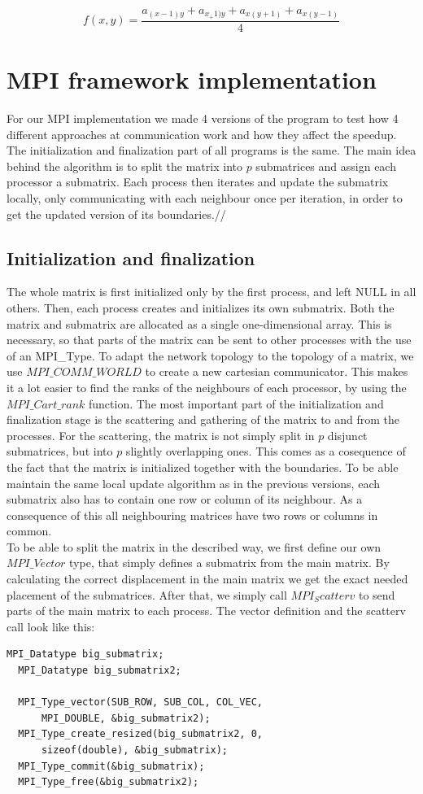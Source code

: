 \documentclass[11pt]{article}
\begin{document}
\[  f(x, y) = \frac{a_{(x-1)y} + a_{x_+1)y} + a_{x(y+1)} + a_{x(y-1)}}{4}  \]



\section{MPI framework implementation}

For our MPI implementation we made 4 versions of the program to test how 4 different approaches at communication work and how they affect the speedup.
The initialization and finalization part of all programs is the same. The main idea behind the algorithm is to split the matrix into $p$ submatrices and assign
each processor a submatrix. Each process then iterates and update the submatrix locally, only communicating with each neighbour once per iteration, in order to
get the updated version of its boundaries.//
\subsection{Initialization and finalization}
The whole matrix is first initialized only by the first process, and left NULL in all others.
Then, each process creates and initializes its own submatrix. Both the matrix and submatrix are allocated as a single one-dimensional array. This is necessary, so that 
parts of the matrix can be sent to other processes with the use of an MPI\_Type. To adapt the network topology to the topology of a matrix, we use $MPI\_COMM\_WORLD$ to
create a new cartesian communicator. This makes it a lot easier to find the ranks of the neighbours of each processor, by using the $MPI\_Cart\_rank$ function.
The most important part of the initialization and finalization stage is the scattering and gathering of the matrix to and from the processes. For the scattering, the
matrix is not simply split in $p$ disjunct submatrices, but into $p$ slightly overlapping ones. This comes as a cosequence of the fact that the matrix is initialized together
with the boundaries. To be able maintain the same local update algorithm as in the previous versions, each submatrix also has to contain one row or column of its neighbour.
As a consequence of this all neighbouring matrices have two rows or columns in common.\\
To be able to split the matrix in the described way, we first define our own $MPI\_Vector$ type, that simply defines a submatrix from the main matrix. By calculating the
correct displacement in the main matrix we get the exact needed placement of the submatrices. After that, we simply call $MPI_Scatterv$ to send parts of the main matrix to each
process. The vector definition and the scatterv call look like this:
\begin{lstlisting}[label=some-code, caption=Vector type definition]
  MPI_Datatype big_submatrix;
  MPI_Datatype big_submatrix2;

  MPI_Type_vector(SUB_ROW, SUB_COL, COL_VEC, 
      MPI_DOUBLE, &big_submatrix2);
  MPI_Type_create_resized(big_submatrix2, 0, 
      sizeof(double), &big_submatrix);
  MPI_Type_commit(&big_submatrix);
  MPI_Type_free(&big_submatrix2);
\end{lstlisting}
\end{document}
